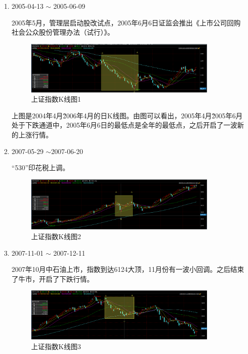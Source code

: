 \documentclass[12pt,a4paper]{article}
\begin{document}
\begin{enumerate}[1)]

\item 2005-04-13 $\sim$ 2005-06-09
	
	 2005年5月，管理层启动股改试点，2005年6月6日证监会推出《上市公司回购社会公众股份管理办法（试行）》。
	 
	 
	 \begin{figure}[H]
		\centering
		\includegraphics[width=0.9\textwidth]{img/11.png}%
		\caption{上证指数K线图1}
	\end{figure}
		
	上图是2004年4月\~2006年4月的日K线图。由图可以看出，2005年4月\~2005年6月处于下跌通道中，2005年6月6日的最低点是全年的最低点，之后开启了一波新的上涨行情。
\item 2007-05-29 $\sim$2007-06-20
	
	“530”印花税上调。
	
	 \begin{figure}[H]
		\centering
		\includegraphics[width=0.9\textwidth]{img/12.png}%
		\caption{上证指数K线图2}
	\end{figure}
	
	
	
\item 2007-11-01 $\sim$ 2007-12-11 

	2007年10月中石油上市，指数到达6124大顶，11月份有一波小回调。之后结束了牛市，开启了下跌行情。

	\begin{figure}[H]
		\centering
		\includegraphics[width=0.9\textwidth]{img/13.png}%
		\caption{上证指数K线图3}
	\end{figure}
	

\end{enumerate}
\end{document}
